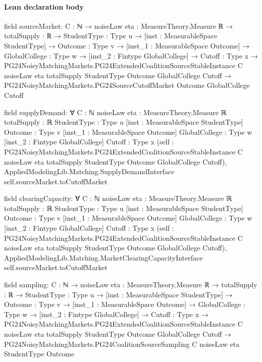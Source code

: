 \documentclass[10pt]{article}
\begin{document}
\paragraph{Lean declaration body}
\begin{ReviewVerbatim}
field sourceMarket:
{C : ℕ} →
  {noiseLaw eta : MeasureTheory.Measure ℝ} →
    {totalSupply : ℝ} →
      {StudentType : Type u} →
        [inst : MeasurableSpace StudentType] →
          {Outcome : Type v} →
            [inst_1 : MeasurableSpace Outcome] →
              {GlobalCollege : Type w} →
                [inst_2 : Fintype GlobalCollege] →
                  {Cutoff : Type x} →
                    PG24NoisyMatchingMarkets.PG24ExtendedCoalitionSourceStableInstance C noiseLaw eta totalSupply
                        StudentType Outcome GlobalCollege Cutoff →
                      PG24NoisyMatchingMarkets.PG24SourceCutoffMarket Outcome GlobalCollege Cutoff

field supplyDemand:
∀ {C : ℕ} {noiseLaw eta : MeasureTheory.Measure ℝ} {totalSupply : ℝ} {StudentType : Type u}
  [inst : MeasurableSpace StudentType] {Outcome : Type v} [inst_1 : MeasurableSpace Outcome] {GlobalCollege : Type w}
  [inst_2 : Fintype GlobalCollege] {Cutoff : Type x}
  (self :
    PG24NoisyMatchingMarkets.PG24ExtendedCoalitionSourceStableInstance C noiseLaw eta totalSupply StudentType Outcome
      GlobalCollege Cutoff),
  AppliedModelingLib.Matching.SupplyDemandInterface self.sourceMarket.toCutoffMarket

field clearingCapacity:
∀ {C : ℕ} {noiseLaw eta : MeasureTheory.Measure ℝ} {totalSupply : ℝ} {StudentType : Type u}
  [inst : MeasurableSpace StudentType] {Outcome : Type v} [inst_1 : MeasurableSpace Outcome] {GlobalCollege : Type w}
  [inst_2 : Fintype GlobalCollege] {Cutoff : Type x}
  (self :
    PG24NoisyMatchingMarkets.PG24ExtendedCoalitionSourceStableInstance C noiseLaw eta totalSupply StudentType Outcome
      GlobalCollege Cutoff),
  AppliedModelingLib.Matching.MarketClearingCapacityInterface self.sourceMarket.toCutoffMarket

field sampling:
{C : ℕ} →
  {noiseLaw eta : MeasureTheory.Measure ℝ} →
    {totalSupply : ℝ} →
      {StudentType : Type u} →
        [inst : MeasurableSpace StudentType] →
          {Outcome : Type v} →
            [inst_1 : MeasurableSpace Outcome] →
              {GlobalCollege : Type w} →
                [inst_2 : Fintype GlobalCollege] →
                  {Cutoff : Type x} →
                    PG24NoisyMatchingMarkets.PG24ExtendedCoalitionSourceStableInstance C noiseLaw eta totalSupply
                        StudentType Outcome GlobalCollege Cutoff →
                      PG24NoisyMatchingMarkets.PG24CoalitionSourceSampling C noiseLaw eta StudentType Outcome


\end{ReviewVerbatim}
\end{document}
